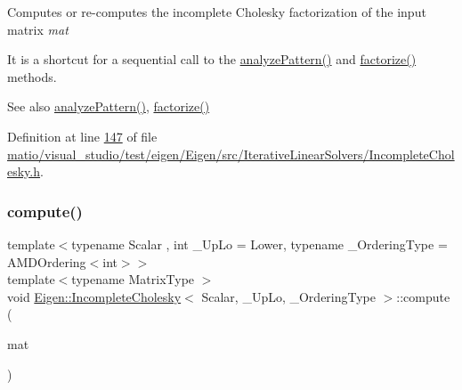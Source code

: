 Computes or re-\/computes the incomplete Cholesky factorization of the input matrix {\itshape mat} 

It is a shortcut for a sequential call to the \hyperlink{class_eigen_1_1_incomplete_cholesky_a702560ecdddef77dc51d20ab22bd974e}{analyze\+Pattern()} and \hyperlink{class_eigen_1_1_incomplete_cholesky_ac39c75ff7ca5d2db9a9f03b937e12601}{factorize()} methods.

\begin{DoxySeeAlso}{See also}
\hyperlink{class_eigen_1_1_incomplete_cholesky_a702560ecdddef77dc51d20ab22bd974e}{analyze\+Pattern()}, \hyperlink{class_eigen_1_1_incomplete_cholesky_ac39c75ff7ca5d2db9a9f03b937e12601}{factorize()} 
\end{DoxySeeAlso}


Definition at line \hyperlink{matio_2visual__studio_2test_2eigen_2_eigen_2src_2_iterative_linear_solvers_2_incomplete_cholesky_8h_source_l00147}{147} of file \hyperlink{matio_2visual__studio_2test_2eigen_2_eigen_2src_2_iterative_linear_solvers_2_incomplete_cholesky_8h_source}{matio/visual\+\_\+studio/test/eigen/\+Eigen/src/\+Iterative\+Linear\+Solvers/\+Incomplete\+Cholesky.\+h}.

\mbox{\label{class_eigen_1_1_incomplete_cholesky_a7966bedeebbeaa7a8fe4dd1da3797a0b}} 
\subsubsection{\texorpdfstring{compute()}{compute()}\hspace{0.1cm}{\footnotesize\ttfamily [2/2]}}
{\footnotesize\ttfamily template$<$typename Scalar , int \+\_\+\+Up\+Lo = Lower, typename \+\_\+\+Ordering\+Type  = A\+M\+D\+Ordering$<$int$>$$>$ \\
template$<$typename Matrix\+Type $>$ \\
void \hyperlink{class_eigen_1_1_incomplete_cholesky}{Eigen\+::\+Incomplete\+Cholesky}$<$ Scalar, \+\_\+\+Up\+Lo, \+\_\+\+Ordering\+Type $>$\+::compute (\begin{DoxyParamCaption}\item[{const Matrix\+Type \&}]{mat }\end{DoxyParamCaption})\hspace{0.3cm}{\ttfamily [inline]}}

